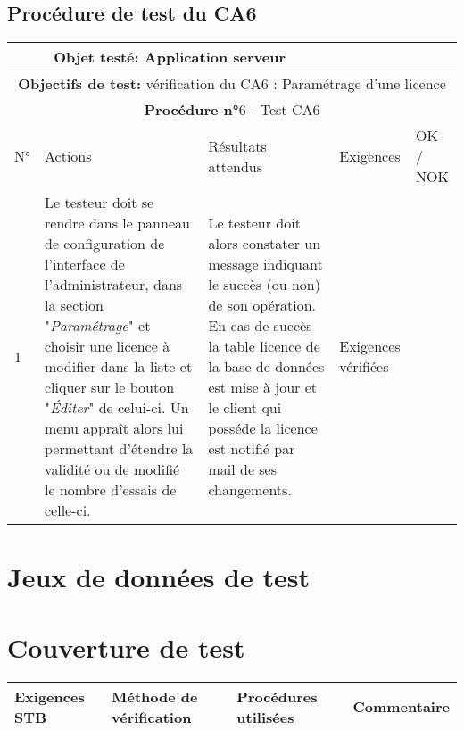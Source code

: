 \section{Procédure de test du CA6}
\begin{table}[!h]
        \centering
        \begin{tabular}{|m{0.6cm}|
                         >{\raggedright\arraybackslash}m{4cm}|
                         >{\raggedright\arraybackslash}m{6.4cm}|
                         >{\raggedright\arraybackslash}m{2cm}|
                         m{1cm}|}
            \hline
            \multicolumn{3}{|c|}{
                \textbf{Objet testé: } Application serveur
            } & \multicolumn{2}{|c|}{
                \textbf{Version: } version    
            } \\
            \hline
            \multicolumn{5}{|c|}{\textbf{Objectifs de test:} 
                vérification du CA6 : Paramétrage d'une licence} \\
            \hline
            \multicolumn{5}{|c|}{
                \textbf{Procédure n°}6 - Test CA6
            } \\
            \hline
            N° & Actions & Résultats attendus & Exigences & OK / NOK \\
            \hline      %
            1 & Le testeur doit se rendre dans le panneau de configuration
                de l'interface de l'administrateur, dans la section 
                "\emph{Paramétrage}" et choisir une licence à modifier
                dans la liste et cliquer sur le bouton "\emph{Éditer}" 
                de celui-ci. Un menu appraît alors lui permettant d'étendre
                la validité ou de modifié le nombre d'essais de celle-ci.
              & Le testeur doit alors constater un message indiquant le 
                succès (ou non) de son opération. En cas de succès la 
                table licence de la base de données est mise à jour et
                le client qui posséde la licence est notifié par mail de 
                ses changements. 
              & Exigences vérifiées & \\
            \hline
        \end{tabular} 
        \label{tab:tab6}
\end{table}
\newpage

\chapter{Jeux de données de test}

\chapter{Couverture de test}

\begin{table}[!h]
    \centering
    \begin{tabular}{|l|l|l|l|}
        \hline
            \textbf{Exigences STB} & \textbf{Méthode de vérification} & \textbf{Procédures utilisées} & \textbf{Commentaire} \\
        \hline
    \end{tabular}
    \label{tab:tab7}
\end{table}

